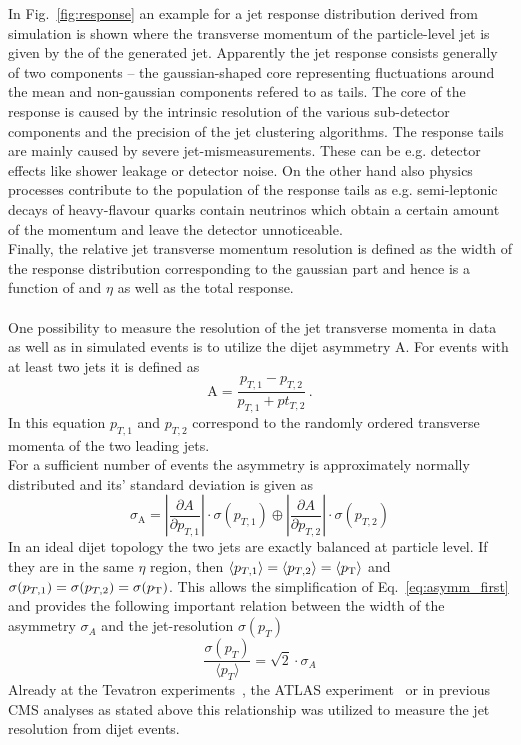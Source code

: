 In Fig.~\ref{fig:response} an example for a jet response distribution derived from simulation is shown where the transverse momentum of the particle-level jet is given by the \pt of the generated jet. Apparently the jet response consists generally of two components -- the gaussian-shaped core representing fluctuations around the mean and non-gaussian components refered to as tails. The core of the response is caused by the intrinsic resolution of the various sub-detector components and the precision of the jet clustering algorithms. The response tails are mainly caused by severe jet-mismeasurements. These can be e.g. detector effects like shower leakage or detector noise. On the other hand also physics processes contribute to the population of the response tails as e.g. semi-leptonic decays of heavy-flavour quarks contain neutrinos which obtain a certain amount of the momentum and leave the detector unnoticeable. \\
Finally, the relative jet transverse momentum resolution is defined as the width of the response distribution corresponding to the gaussian part and hence is a function of \pt and $\eta$ as well as the total response.\\
\\
One possibility to measure the resolution of the jet transverse momenta in data as well as in simulated events is to utilize the dijet asymmetry A. For events with at least two jets it is defined as
\begin{equation}
\label{eq:asymmdef}
  \mathrm{A} = \frac{p_{T,1} - p_{T,2}}{p_{T,1} + pt_{T,2}} \, .
 \end{equation}
 In this equation $p_{T,1}$ and $p_{T,2}$ correspond to the randomly ordered transverse momenta of the two leading jets. \\
 For a sufficient number of events the asymmetry is approximately normally distributed and its' standard deviation is given as
 \begin{equation}
 \label{eq:asymm_first}
  {\sigma_{\mathrm{A}}} = \left\lvert \frac{\partial A}{\partial p_{T,1}} \right\rvert \cdot \sigma(p_{T,1}) \oplus  \left\lvert \frac{\partial A}{\partial p_{T,2}} \right\rvert \cdot \sigma(p_{T,2})
 \end{equation}
 In an ideal dijet topology the two jets are exactly balanced at particle level. If they are in the same $\eta$ region, then $\langle p_{T,1} \rangle = \langle p_{T,2} \rangle = \langle p_{\text{T}} \rangle$ and $\sigma (p_{T,1}) = \sigma (p_{T,2}) = \sigma (p_{\text{T}})$. This allows the simplification of Eq.~\ref{eq:asymm_first} and provides the following important relation between the width of the asymmetry $\sigma_{A}$ and the jet-\pt resolution $\sigma (p_{T})$
 \begin{equation}
 \label{eq:asymm}
  \frac{\sigma (p_{T})}{\langle p_{T} \rangle} = \sqrt{2} \cdot \sigma_{A}
 \end{equation}
Already at the Tevatron experiments~\cite{oai:arXiv.org:hep-ex/0012046, JetsD0}, the ATLAS experiment~\cite{Aad:2012ag} or in previous CMS analyses as stated above this relationship was utilized to measure the jet resolution from dijet events.  

